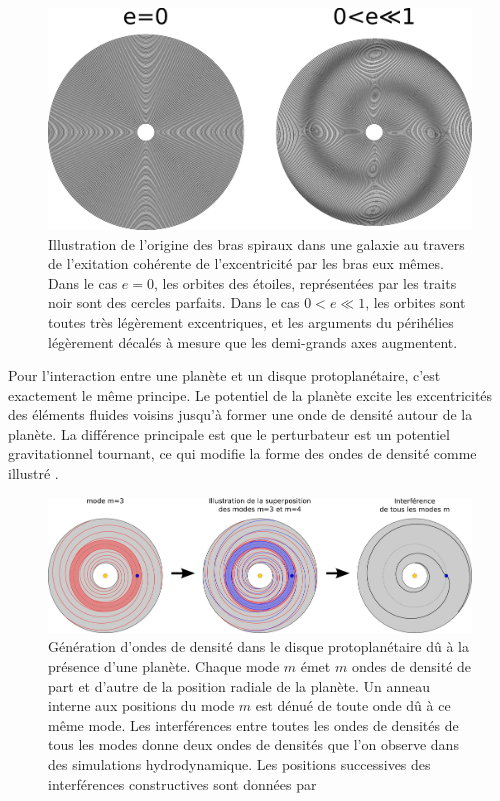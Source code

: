 \begin{figure}[htb]
\centering
\includegraphics[width=0.9\linewidth]{figure/spiral_arms.pdf}
\caption{Illustration de l'origine des bras spiraux dans une galaxie au travers de l'exitation cohérente de l'excentricité par les bras eux mêmes. Dans le cas \og $e=0$\fg, les orbites des étoiles, représentées par les traits noir sont des cercles parfaits. Dans le cas \og $0<e\ll 1$\fg, les orbites sont toutes très légèrement excentriques, et les arguments du périhélies légèrement décalés à mesure que les demi-grands axes augmentent.}\label{fig:spiral_arms}
\end{figure}

\bigskip

Pour l'interaction entre une planète et un disque protoplanétaire, c'est exactement le même principe. Le potentiel de la planète excite les excentricités des éléments fluides voisins jusqu'à former une onde de densité autour de la planète. La différence principale est que le perturbateur est un potentiel gravitationnel tournant, ce qui modifie la forme des ondes de densité comme illustré . 

\begin{figure}[htb]
\centering
\includegraphics[width=\linewidth]{figure/lindblad_torque.pdf}
\caption{Génération d'ondes de densité dans le disque protoplanétaire dû à la présence d'une planète. Chaque mode $m$ émet $m$ ondes de densité de part et d'autre de la position radiale de la planète. Un anneau interne  aux positions du mode $m$ est dénué de toute onde dû à ce même mode. Les interférences entre toutes les ondes de densités de tous les modes donne deux ondes de densités que l'on observe dans des simulations hydrodynamique. Les positions successives des interférences constructives sont données par \cite[eq. (13) et (24)]{ogilvie2002wake}}\label{fig:lindblad_torque}
\end{figure}


